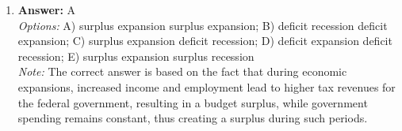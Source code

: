 \documentclass[12pt]{article}
\begin{document}
\begin{enumerate}[label=\arabic*.]
\\ \textit{Note:} The statement is correct because average total cost is derived from the sum of total fixed costs and total variable costs, reflecting the total expenses incurred in production divided by the quantity of output produced.
\item \textbf{Answer:} A
\\ \textit{Options:} A) surplus expansion surplus expansion; B) deficit recession deficit expansion; C) surplus expansion deficit recession; D) deficit expansion deficit recession; E) surplus expansion surplus recession
\\ \textit{Note:} The correct answer is based on the fact that during economic expansions, increased income and employment lead to higher tax revenues for the federal government, resulting in a budget surplus, while government spending remains constant, thus creating a surplus during such periods.
\end{enumerate}
\end{document}
